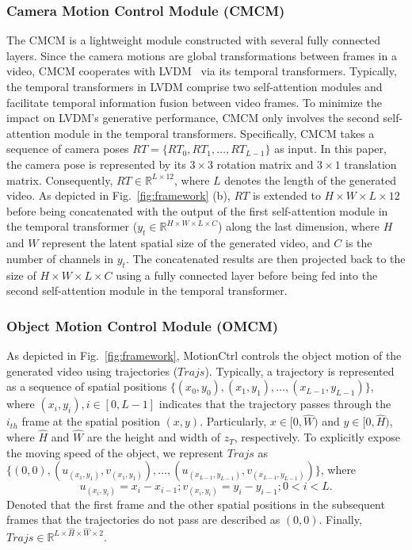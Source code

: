 \documentclass[sigconf]{acmart}
\begin{document}
\subsubsection{Camera Motion Control Module (CMCM)}

The CMCM is a lightweight module constructed with several fully connected layers. Since the camera motions are global transformations between frames in a video, CMCM cooperates with LVDM~\cite{he2022lvdm} via its temporal transformers. Typically, the temporal transformers in LVDM comprise two self-attention modules and facilitate temporal information fusion between video frames. To minimize the impact on LVDM's generative performance, CMCM only involves the second self-attention module in the temporal transformers. Specifically, CMCM takes a sequence of camera poses $RT=\{RT_0, RT_1, \dots, RT_{L-1}\}$ as input. In this paper, the camera pose is represented by its $3 \times 3$ rotation matrix and $3 \times 1$ translation matrix. Consequently, $RT \in \mathbb{R}^{L \times 12}$, where $L$ denotes the length of the generated video. As depicted in Fig.~\ref{fig:framework} (b), $RT$ is extended to $H \times W \times L \times 12$ before being concatenated with the output of the first self-attention module in the temporal transformer ($y_t \in \mathbb{R}^{H\times W\times L\times C}$) along the last dimension, where $H$ and $W$ represent the latent spatial size of the generated video, and $C$ is the number of channels in $y_t$. The concatenated results are then projected back to the size of ${H\times W\times L\times C}$ using a fully connected layer before being fed into the second self-attention module in the temporal transformer.

\subsubsection{Object Motion Control Module (OMCM)}

As depicted in Fig.~\ref{fig:framework}, MotionCtrl controls the object motion of the generated video using trajectories ($Trajs$). Typically, a trajectory is represented as a sequence of spatial positions $\{(x_0, y_0), (x_1, y_1), \dots, (x_{L-1}, y_{L-1})\}$, where $(x_i, y_i), i\in [0, L-1]$ indicates that the trajectory passes through the $i_{th}$ frame at the spatial position $(x, y)$. Particularly, $x \in [0, \hat{W})$ and $y \in [0, \hat{H})$, where $\hat{H}$ and $\hat{W}$ are the height and width of $z_T$, respectively. To explicitly expose the moving speed of the object, we represent $Trajs$ as \\
$\{(0, 0), (u_{(x_1, y_1)}, v_{(x_1, y_1)}), \dots, (u_{(x_{L-1}, y_{L-1})}, v_{(x_{L-1}, y_{L-1})})\}$, where
\begin{equation}
    u_{(x_i, y_i)} = x_{i} - x_{i-1}; v_{(x_i, y_i)} = y_{i} - y_{i-1}; 0 < i < L.
\end{equation}
Denoted that the first frame and the other spatial positions in the subsequent frames that the trajectories do not pass are described as $(0, 0)$. Finally, $Trajs \in \mathbb{R}^{L\times \hat{H} \times \hat{W} \times 2}$.
\end{document}
